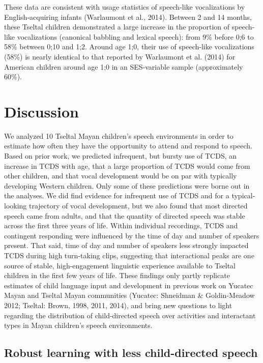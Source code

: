 \documentclass[floatsintext,man]{apa6}
\theoremstyle{definition}
\theoremstyle{definition}
\theoremstyle{definition}
\theoremstyle{remark}
\begin{document}
These data are consistent with usage statistics of speech-like
vocalizations by English-acquiring infants (Warlaumont et al., 2014).
Between 2 and 14 months, these Tseltal children demonstrated a large
increase in the proportion of speech-like vocalizations (canonical
babbling and lexical speech): from 9\% before 0;6 to 58\% between 0;10
and 1;2. Around age 1;0, their use of speech-like vocalizations (58\%)
is nearly identical to that reported by Warlaumont et al. (2014) for
American children around age 1;0 in an SES-variable sample
(approximately 60\%).

\section{Discussion}\label{disc}

We analyzed 10 Tseltal Mayan children's speech environments in order to
estimate how often they have the opportunity to attend and respond to
speech. Based on prior work, we predicted infrequent, but bursty use of
TCDS, an increase in TCDS with age, that a large proportion of TCDS
would come from other children, and that vocal development would be on
par with typically developing Western children. Only some of these
predictions were borne out in the analyses. We did find evidence for
infrequent use of TCDS and for a typical-looking trajectory of vocal
development, but we also found that most directed speech came from
adults, and that the quantity of directed speech was stable across the
first three years of life. Within individual recordings, TCDS and
contingent responding were influenced by the time of day and number of
speakers present. That said, time of day and number of speakers less
strongly impacted TCDS during high turn-taking clips, suggesting that
interactional peaks are one source of stable, high-engagement linguistic
experience available to Tseltal children in the first few years of life.
These findings only partly replicate estimates of child language input
and development in previous work on Yucatec Mayan and Tseltal Mayan
communities (Yucatec: Shneidman \& Goldin-Meadow 2012; Tseltal: Brown,
1998, 2011, 2014), and bring new questions to light regarding the
distribution of child-directed speech over activities and interactant
types in Mayan children's speech environments.

\subsection{Robust learning with less child-directed
speech}\label{robust-learning-with-less-child-directed-speech}
\end{document}
